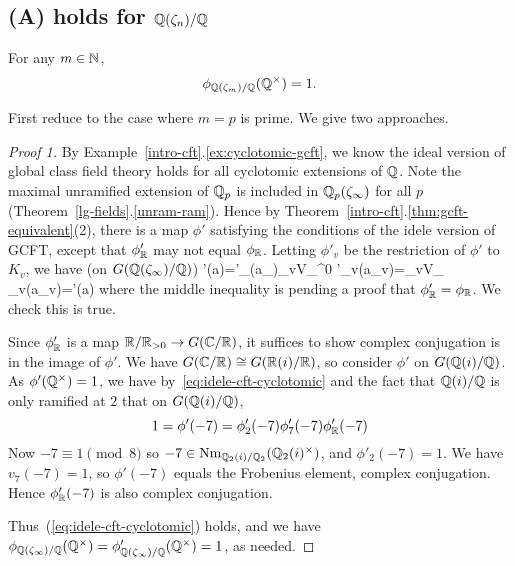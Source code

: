 \subsection{(A) holds for $\mathbb{Q}(\zeta_n)/\mathbb{Q}$}
\begin{pr}
For any $m\in \mathbb{N}$, 
\[
\phi_{\mathbb{Q}(\zeta_m)/\mathbb{Q}}(\mathbb{Q}^{\times})=1.
\]
\end{pr}
First reduce to the case where $m=p$ is prime.
We give two approaches.\\

\begin{proof}[Proof 1]
By Example~\ref{intro-cft}.\ref{ex:cyclotomic-gcft}, we know the ideal version of  global class field theory holds for all cyclotomic extensions of $\mathbb{Q}$. Note the maximal unramified extension of $\mathbb{Q}_p$ is included in $\mathbb{Q}_p(\zeta_{\infty})$ for all $p$ (Theorem~\ref{lg-fields}.\ref{unram-ram}). Hence by Theorem~\ref{intro-cft}.\ref{thm:gcft-equivalent}(2), there is a map $\phi'$ satisfying the conditions of the idele version of GCFT, except that $\phi'_{\mathbb{R}}$ may not equal $\phi_{\mathbb{R}}$. Letting $\phi'_v$ be the restriction of $\phi'$ to $K_v$, we have (on $G(\mathbb{Q}(\zeta_{\infty})/\mathbb{Q})$)
\phi'(\mathbf a)=\phi'_{\R}(a_{\R})\prod_{v\in V_{\Q}^0} \phi'_v(a_v)=\prod_{v\in V_{\Q}} \phi_v(a_v)=\phi'(\mathbf a)
\eeq
where the middle inequality is pending a proof that $\phi'_{\mathbb{R}}=\phi_{\mathbb{R}}$. We check this is true.

Since $\phi'_{\mathbb{R}}$ is a map $\mathbb{R}/\mathbb{R}_{>0}\to G(\mathbb{C}/\mathbb{R})$, it suffices to show complex conjugation is in the image of $\phi'$. We have $G(\mathbb{C}/\mathbb{R})\cong G(\mathbb{R}(i)/\mathbb{R})$, so consider $\phi'$ on $G(\mathbb{Q}(i)/\mathbb{Q})$. As $\phi'(\mathbb{Q}^{\times})=1$, we have by~\eqref{eq:idele-cft-cyclotomic} and the fact that $\mathbb{Q}(i)/\mathbb{Q}$ is only ramified at $2$ that on $G(\mathbb{Q}(i)/\mathbb{Q})$,
\[
1=\phi'(-7)=\phi'_2(-7)\phi'_7(-7)\phi'_{\mathbb{R}}(-7)
\]
Now $-7\equiv 1\pmod 8$ so $-7\in \operatorname{Nm}_{\mathbb{Q}_2(i)/\mathbb{Q}_2}(\mathbb{Q}_2(i)^{\times})$, and $\phi'_2(-7)=1$. We have $v_7(-7)=1$, so $\phi'(-7)$ equals the Frobenius element, complex conjugation. Hence $\phi'_{\mathbb{R}}(-7)$ is also complex conjugation.

Thus~(\ref{eq:idele-cft-cyclotomic}) holds, and we have $\phi_{\mathbb{Q}(\zeta_{\infty})/\mathbb{Q}}(\mathbb{Q}^{\times})=\phi'_{\mathbb{Q}(\zeta_{\infty})/\mathbb{Q}}(\mathbb{Q}^{\times})=1$, as needed.
\end{proof}
